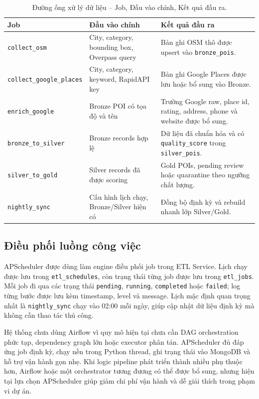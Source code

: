 \documentclass[12pt,a4paper]{article}
\begin{document}
\begin{longtable}{@{}p{}p{}p{}@{}}
\caption{Đường ống xử lý dữ liệu -- Job, Đầu vào chính, Kết quả đầu ra.}\\
\toprule
\textbf{Job} & \textbf{Đầu vào chính} & \textbf{Kết quả đầu ra} \\
\midrule
\texttt{collect\_osm} & City, category, bounding box, Overpass query & Bản ghi OSM thô được upsert vào \texttt{bronze\_pois}. \\
\texttt{collect\_google\_places} & City, category, keyword, RapidAPI key & Bản ghi Google Places được lưu hoặc bổ sung vào Bronze. \\
\texttt{enrich\_google} & Bronze POI có tọa độ và tên & Trường Google raw, place id, rating, address, phone và website được bổ sung. \\
\texttt{bronze\_to\_silver} & Bronze records hợp lệ & Dữ liệu đã chuẩn hóa và có \texttt{quality\_score} trong \texttt{silver\_pois}. \\
\texttt{silver\_to\_gold} & Silver records đã được scoring & Gold POIs, pending review hoặc quarantine theo ngưỡng chất lượng. \\
\texttt{nightly\_sync} & Cấu hình lịch chạy, Bronze/Silver hiện có & Đồng bộ định kỳ và rebuild nhanh lớp Silver/Gold. \\
\bottomrule
\end{longtable}

\subsection{Điều phối luồng công việc}

APScheduler được dùng làm engine điều phối job trong ETL Service. Lịch chạy được lưu trong \texttt{etl\_schedules}, còn trạng thái từng job được lưu trong \texttt{etl\_jobs}. Mỗi job đi qua các trạng thái \texttt{pending}, \texttt{running}, \texttt{completed} hoặc \texttt{failed}; log từng bước được lưu kèm timestamp, level và message. Lịch mặc định quan trọng nhất là \texttt{nightly\_sync} chạy vào 02:00 mỗi ngày, giúp cập nhật dữ liệu định kỳ mà không cần thao tác thủ công.

Hệ thống chưa dùng Airflow vì quy mô hiện tại chưa cần DAG orchestration phức tạp, dependency graph lớn hoặc executor phân tán. APScheduler đủ đáp ứng job định kỳ, chạy nền trong Python thread, ghi trạng thái vào MongoDB và hỗ trợ vận hành gọn nhẹ. Khi logic pipeline phát triển thành nhiều phụ thuộc hơn, Airflow hoặc một orchestrator tương đương có thể được bổ sung, nhưng hiện tại lựa chọn APScheduler giúp giảm chi phí vận hành và dễ giải thích trong phạm vi dự án.
\end{document}
